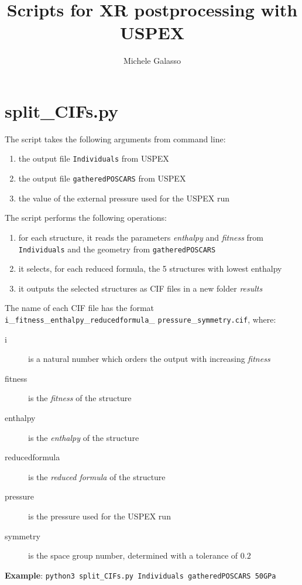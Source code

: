 \documentclass{article}
\begin{document}
\title{Scripts for XR postprocessing with USPEX}
\author{Michele Galasso}

\maketitle


\section{split\_CIFs.py}
The script takes the following arguments from command line:
\begin{enumerate}
	\item the output file \texttt{Individuals} from USPEX
	\item the output file \texttt{gatheredPOSCARS} from USPEX
	\item the value of the external pressure used for the USPEX run
\end{enumerate}
The script performs the following operations:
\begin{enumerate}
	\item for each structure, it reads the parameters \emph{enthalpy} and \emph{fitness} from \texttt{Individuals} and the geometry from \texttt{gatheredPOSCARS}
	\item it selects, for each reduced formula, the 5 structures with lowest enthalpy
	\item it outputs the selected structures as CIF files in a new folder \textit{results}
\end{enumerate}
The name of each CIF file has the format \texttt{i}\_\texttt{fitness}\_\texttt{enthalpy}\_\texttt{reducedformula}\_ \texttt{pressure}\_\texttt{symmetry.cif}, where:
\begin{description}
	\item[i] is a natural number which orders the output with increasing \emph{fitness}
	\item[fitness] is the \emph{fitness} of the structure
	\item[enthalpy] is the \emph{enthalpy} of the structure
	\item[reducedformula] is the \emph{reduced formula} of the structure
	\item[pressure] is the pressure used for the USPEX run
	\item[symmetry] is the space group number, determined with a tolerance of $0.2$\end{description}
\textbf{Example}: \texttt{python3 split\_CIFs.py Individuals gatheredPOSCARS 50GPa}
\end{document}
